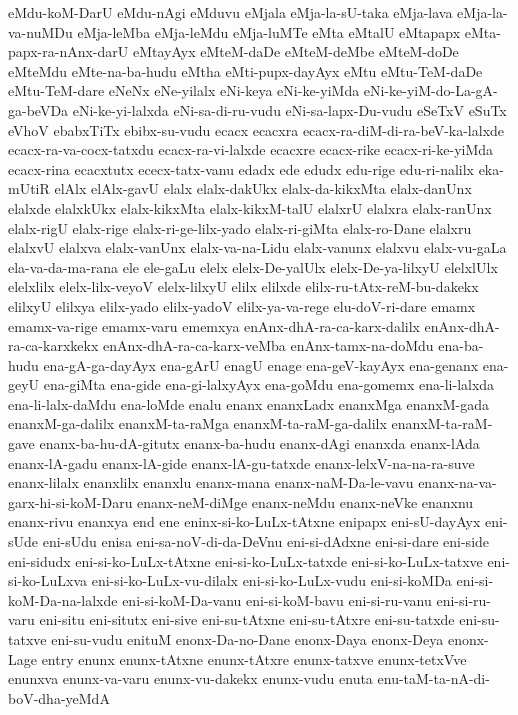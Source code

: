 {eMdu-koM-DarU
eMdu-nAgi
eMduvu
eMjala
eMja-la-sU-taka
eMja-lava
eMja-la-va-nuMDu
eMja-leMba
eMja-leMdu
eMja-luMTe
eMta
eMtalU
eMtapapx
eMta-papx-ra-nAnx-darU
eMtayAyx
eMteM-daDe
eMteM-deMbe
eMteM-doDe
eMteMdu
eMte-na-ba-hudu
eMtha
eMti-pupx-dayAyx
eMtu
eMtu-TeM-daDe
eMtu-TeM-dare
eNeNx
eNe-yilalx
eNi-keya
eNi-ke-yiMda
eNi-ke-yiM-do-La-gA-ga-beVDa
eNi-ke-yi-lalxda
eNi-sa-di-ru-vudu
eNi-sa-lapx-Du-vudu
eSeTxV
eSuTx
eVhoV
ebabxTiTx
ebibx-su-vudu
ecacx
ecacxra
ecacx-ra-diM-di-ra-beV-ka-lalxde
ecacx-ra-va-cocx-tatxdu
ecacx-ra-vi-lalxde
ecacxre
ecacx-rike
ecacx-ri-ke-yiMda
ecacx-rina
ecacxtutx
ececx-tatx-vanu
edadx
ede
edudx
edu-rige
edu-ri-nalilx
eka-mUtiR
elAlx
elAlx-gavU
elalx
elalx-dakUkx
elalx-da-kikxMta
elalx-danUnx
elalxde
elalxkUkx
elalx-kikxMta
elalx-kikxM-talU
elalxrU
elalxra
elalx-ranUnx
elalx-rigU
elalx-rige
elalx-ri-ge-lilx-yado
elalx-ri-giMta
elalx-ro-Dane
elalxru
elalxvU
elalxva
elalx-vanUnx
elalx-va-na-Lidu
elalx-vanunx
elalxvu
elalx-vu-gaLa
ela-va-da-ma-rana
ele
ele-gaLu
elelx
elelx-De-yalUlx
elelx-De-ya-lilxyU
elelxlUlx
elelxlilx
elelx-lilx-veyoV
elelx-lilxyU
elilx
elilxde
elilx-ru-tAtx-reM-bu-dakekx
elilxyU
elilxya
elilx-yado
elilx-yadoV
elilx-ya-va-rege
elu-doV-ri-dare
emamx
emamx-va-rige
emamx-varu
ememxya
enAnx-dhA-ra-ca-karx-dalilx
enAnx-dhA-ra-ca-karxkekx
enAnx-dhA-ra-ca-karx-veMba
enAnx-tamx-na-doMdu
ena-ba-hudu
ena-gA-ga-dayAyx
ena-gArU
enagU
enage
ena-geV-kayAyx
ena-genanx
ena-geyU
ena-giMta
ena-gide
ena-gi-lalxyAyx
ena-goMdu
ena-gomemx
ena-li-lalxda
ena-li-lalx-daMdu
ena-loMde
enalu
enanx
enanxLadx
enanxMga
enanxM-gada
enanxM-ga-dalilx
enanxM-ta-raMga
enanxM-ta-raM-ga-dalilx
enanxM-ta-raM-gave
enanx-ba-hu-dA-gitutx
enanx-ba-hudu
enanx-dAgi
enanxda
enanx-lAda
enanx-lA-gadu
enanx-lA-gide
enanx-lA-gu-tatxde
enanx-lelxV-na-na-ra-suve
enanx-lilalx
enanxlilx
enanxlu
enanx-mana
enanx-naM-Da-le-vavu
enanx-na-va-garx-hi-si-koM-Daru
enanx-neM-diMge
enanx-neMdu
enanx-neVke
enanxnu
enanx-rivu
enanxya
end
ene
eninx-si-ko-LuLx-tAtxne
enipapx
eni-sU-dayAyx
eni-sUde
eni-sUdu
enisa
eni-sa-noV-di-da-DeVnu
eni-si-dAdxne
eni-si-dare
eni-side
eni-sidudx
eni-si-ko-LuLx-tAtxne
eni-si-ko-LuLx-tatxde
eni-si-ko-LuLx-tatxve
eni-si-ko-LuLxva
eni-si-ko-LuLx-vu-dilalx
eni-si-ko-LuLx-vudu
eni-si-koMDa
eni-si-koM-Da-na-lalxde
eni-si-koM-Da-vanu
eni-si-koM-bavu
eni-si-ru-vanu
eni-si-ru-varu
eni-situ
eni-situtx
eni-sive
eni-su-tAtxne
eni-su-tAtxre
eni-su-tatxde
eni-su-tatxve
eni-su-vudu
enituM
enonx-Da-no-Dane
enonx-Daya
enonx-Deya
enonx-Lage
entry
enunx
enunx-tAtxne
enunx-tAtxre
enunx-tatxve
enunx-tetxVve
enunxva
enunx-va-varu
enunx-vu-dakekx
enunx-vudu
enuta
enu-taM-ta-nA-di-boV-dha-yeMdA
}
